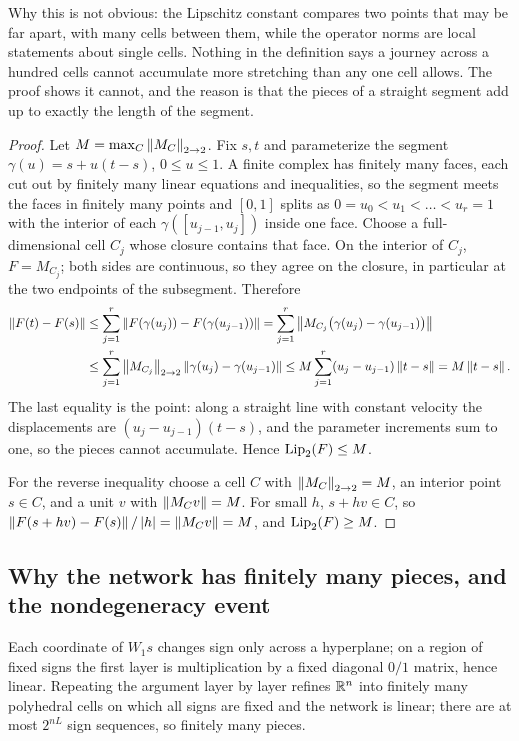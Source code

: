 Why this is not obvious: the Lipschitz constant compares two points that may be far apart, with many cells between them, while the operator norms are local statements about single cells. Nothing in the definition says a journey across a hundred cells cannot accumulate more stretching than any one cell allows. The proof shows it cannot, and the reason is that the pieces of a straight segment add up to exactly the length of the segment.

\begin{proof}
Let $M=\max_C\left\lVert M_C\right\rVert_{2\to 2}$. Fix $s,t$ and parameterize the segment $\gamma(u)=s+u(t-s)$, $0\le u\le 1$. A finite complex has finitely many faces, each cut out by finitely many linear equations and inequalities, so the segment meets the faces in finitely many points and $[0,1]$ splits as $0=u_0<u_1<\dots<u_r=1$ with the interior of each $\gamma([u_{j-1},u_j])$ inside one face. Choose a full-dimensional cell $C_j$ whose closure contains that face. On the interior of $C_j$, $F=M_{C_j}$; both sides are continuous, so they agree on the closure, in particular at the two endpoints of the subsegment. Therefore
\begin{align*}
\left\lVert F(t)-F(s)\right\rVert&\le\sum_{j=1}^r\left\lVert F(\gamma(u_j))-F(\gamma(u_{j-1}))\right\rVert
=\sum_{j=1}^r\left\lVert M_{C_j}\bigl(\gamma(u_j)-\gamma(u_{j-1})\bigr)\right\rVert\\
&\le\sum_{j=1}^r\left\lVert M_{C_j}\right\rVert_{2\to 2}\left\lVert \gamma(u_j)-\gamma(u_{j-1})\right\rVert
\le M\sum_{j=1}^r(u_j-u_{j-1})\left\lVert t-s\right\rVert=M\left\lVert t-s\right\rVert.
\end{align*}
The last equality is the point: along a straight line with constant velocity the displacements are $(u_j-u_{j-1})(t-s)$, and the parameter increments sum to one, so the pieces cannot accumulate. Hence $\operatorname{Lip}_2(F)\le M$.

For the reverse inequality choose a cell $C$ with $\left\lVert M_C\right\rVert_{2\to 2}=M$, an interior point $s\in C$, and a unit $v$ with $\left\lVert M_Cv\right\rVert=M$. For small $h$, $s+hv\in C$, so $\left\lVert F(s+hv)-F(s)\right\rVert/\left\lvert h\right\rvert=\left\lVert M_Cv\right\rVert=M$, and $\operatorname{Lip}_2(F)\ge M$.
\end{proof}

\subsection{Why the network has finitely many pieces, and the nondegeneracy event}

Each coordinate of $W_1s$ changes sign only across a hyperplane; on a region of fixed signs the first layer is multiplication by a fixed diagonal $0/1$ matrix, hence linear. Repeating the argument layer by layer refines $\mathbb{R}^n$ into finitely many polyhedral cells on which all signs are fixed and the network is linear; there are at most $2^{nL}$ sign sequences, so finitely many pieces.

